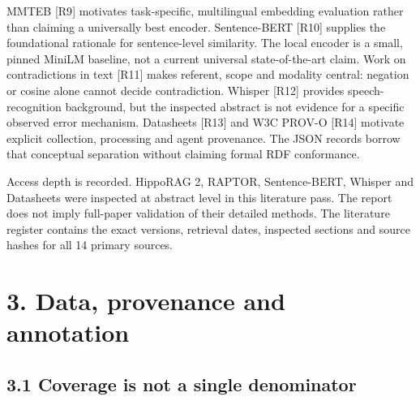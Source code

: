 \documentclass[
  10pt,
]{article}
\begin{document}
MMTEB {[}R9{]} motivates task-specific, multilingual embedding
evaluation rather than claiming a universally best encoder.
Sentence-BERT {[}R10{]} supplies the foundational rationale for
sentence-level similarity. The local encoder is a small, pinned MiniLM
baseline, not a current universal state-of-the-art claim. Work on
contradictions in text {[}R11{]} makes referent, scope and modality
central: negation or cosine alone cannot decide contradiction. Whisper
{[}R12{]} provides speech-recognition background, but the inspected
abstract is not evidence for a specific observed error mechanism.
Datasheets {[}R13{]} and W3C PROV-O {[}R14{]} motivate explicit
collection, processing and agent provenance. The JSON records borrow
that conceptual separation without claiming formal RDF conformance.

Access depth is recorded. HippoRAG 2, RAPTOR, Sentence-BERT, Whisper and
Datasheets were inspected at abstract level in this literature pass. The
report does not imply full-paper validation of their detailed methods.
The literature register contains the exact versions, retrieval dates,
inspected sections and source hashes for all 14 primary sources.

\section{3. Data, provenance and
annotation}\label{data-provenance-and-annotation}

\subsection{3.1 Coverage is not a single
denominator}\label{coverage-is-not-a-single-denominator}
\end{document}
